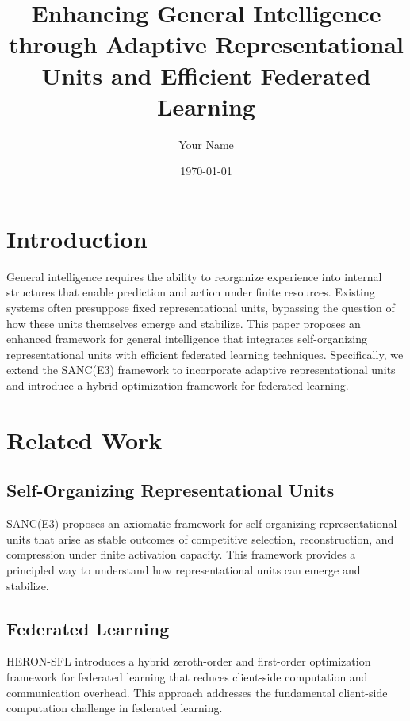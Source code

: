 \documentclass{article}
\title{Enhancing General Intelligence through Adaptive Representational Units and Efficient Federated Learning}
\author{Your Name}
\date{\today}
\begin{document}
\maketitle

\section{Introduction}
\label{sec:introduction}

General intelligence requires the ability to reorganize experience into internal structures that enable prediction and action under finite resources. Existing systems often presuppose fixed representational units, bypassing the question of how these units themselves emerge and stabilize. This paper proposes an enhanced framework for general intelligence that integrates self-organizing representational units with efficient federated learning techniques. Specifically, we extend the SANC(E3) framework to incorporate adaptive representational units and introduce a hybrid optimization framework for federated learning.

\section{Related Work}
\label{sec:related_work}

\subsection{Self-Organizing Representational Units}
\label{subsec:self_org_units}

SANC(E3) \cite{kwon2026axiomaticapproachgeneralintelligence} proposes an axiomatic framework for self-organizing representational units that arise as stable outcomes of competitive selection, reconstruction, and compression under finite activation capacity. This framework provides a principled way to understand how representational units can emerge and stabilize.

\subsection{Federated Learning}
\label{subsec:federated_learning}

HERON-SFL \cite{kou2026leanclientsaccuracyhybrid} introduces a hybrid zeroth-order and first-order optimization framework for federated learning that reduces client-side computation and communication overhead. This approach addresses the fundamental client-side computation challenge in federated learning.
\end{document}
